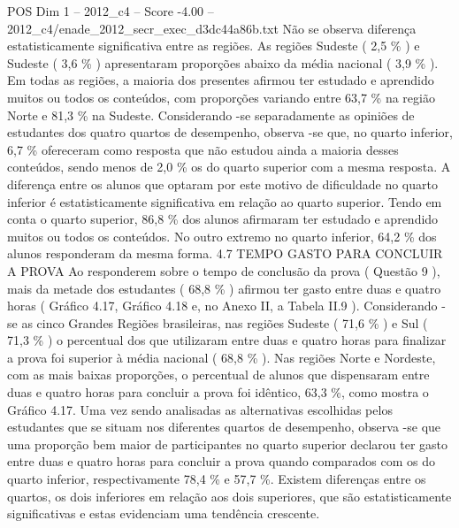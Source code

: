 \begin{textsample}{POS Dim 1 – 2012\_c4 – Score -4.00 – 2012\_c4/enade\_2012\_secr\_exec\_d3dc44a86b.txt}
Não se observa diferença estatisticamente significativa entre as regiões.
As regiões Sudeste ( 2,5 \% ) e Sudeste ( 3,6 \% ) apresentaram proporções abaixo da média nacional ( 3,9 \% ).
Em todas as regiões, a maioria dos presentes afirmou ter estudado e aprendido muitos ou todos os conteúdos, com proporções variando entre 63,7 \% na região Norte e 81,3 \% na Sudeste.
Considerando -se separadamente as opiniões de estudantes dos quatro quartos de desempenho, observa -se que, no quarto inferior, 6,7 \% ofereceram como resposta que não estudou ainda a maioria desses conteúdos, sendo menos de 2,0 \% os do quarto superior com a mesma resposta.
A diferença entre os alunos que optaram por este motivo de dificuldade no quarto inferior é estatisticamente significativa em relação ao quarto superior.
Tendo em conta o quarto superior, 86,8 \% dos alunos afirmaram ter estudado e aprendido muitos ou todos os conteúdos.
No outro extremo no quarto inferior, 64,2 \% dos alunos responderam da mesma forma. 4.7 TEMPO GASTO PARA CONCLUIR A PROVA Ao responderem sobre o tempo de conclusão da prova ( Questão 9 ), mais da metade dos estudantes ( 68,8 \% ) afirmou ter gasto entre duas e quatro horas ( Gráfico 4.17, Gráfico 4.18 e, no Anexo II, a Tabela II.9 ).
Considerando -se as cinco Grandes Regiões brasileiras, nas regiões Sudeste ( 71,6 \% ) e Sul ( 71,3 \% ) o percentual dos que utilizaram entre duas e quatro horas para finalizar a prova foi superior à média nacional ( 68,8 \% ).
Nas regiões Norte e Nordeste, com as mais baixas proporções, o percentual de alunos que dispensaram entre duas e quatro horas para concluir a prova foi idêntico, 63,3 \%, como mostra o Gráfico 4.17.
Uma vez sendo analisadas as alternativas escolhidas pelos estudantes que se situam nos diferentes quartos de desempenho, observa -se que uma proporção bem maior de participantes no quarto superior declarou ter gasto entre duas e quatro horas para concluir a prova quando comparados com os do quarto inferior, respectivamente 78,4 \% e 57,7 \%.
Existem diferenças entre os quartos, os dois inferiores em relação aos dois superiores, que são estatisticamente significativas e estas evidenciam uma tendência crescente.

\end{textsample}
